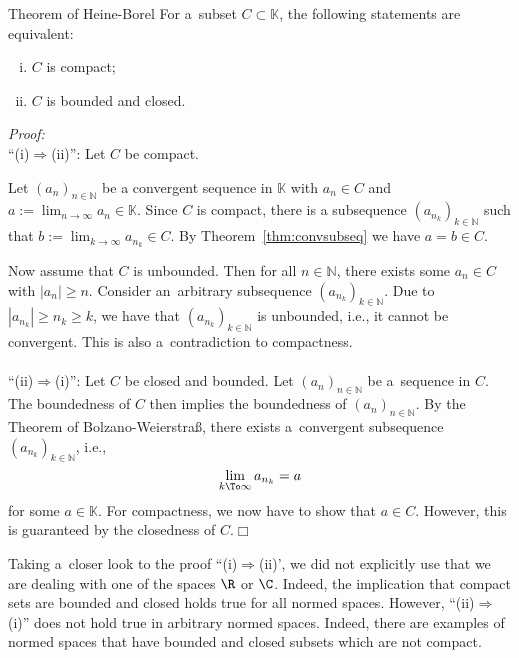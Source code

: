
\begin{Theorem}{Theorem of Heine-Borel}
For a~subset $C\subset\mathbb{K}$, the following statements are equivalent:
\begin{enumerate}[(i)]
 \item $C$ is compact;
 \item $C$ is bounded and closed.
\end{enumerate}
\end{Theorem}
{\em Proof:} \\
``(i)$\Rightarrow$(ii)'': Let $C$ be compact. 

Let $(a_n)_{n\in\mathbb{N}}$ be a convergent sequence in $\mathbb{K}$ with $a_n\in C$ and $a:=\lim_{n\rightarrow\infty} a_n \in\mathbb{K}$. 
Since $C$ is compact, there is a subsequence $(a_{n_k})_{k\in\mathbb{N}}$ such that $b:=\lim_{k\rightarrow\infty} a_{n_k}\in C$.
By Theorem~\ref{thm:convsubseq} we have $a=b\in C$.

Now assume that $C$ is unbounded. Then for all $n\in\mathbb{N}$, there exists some $a_n\in C$ with $|a_n|\geq n$. Consider an~arbitrary subsequence $(a_{n_k})_{k\in\mathbb{N}}$. Due to $|a_{n_k}|\geq n_k\geq k$, we have that $(a_{n_k})_{k\in\mathbb{N}}$ is unbounded, i.e., it cannot be convergent. This is also a~contradiction to compactness.\\
~\\
``(ii)$\Rightarrow$(i)'':
Let $C$ be closed and bounded. Let  $(a_n)_{n\in\mathbb{N}}$ be a~sequence in $C$. The boundedness of $C$ then implies the boundedness of $(a_n)_{n\in\mathbb{N}}$. By the Theorem of Bolzano-Weierstra\ss, there exists a~convergent subsequence  $(a_{n_k})_{k\in\mathbb{N}}$, i.e.,
\[\lim_{k\To\infty}a_{n_k}=a\]
for some $a\in\mathbb{K}$. For compactness, we now have to show that $a\in C$. However, this is guaranteed by the closedness of $C$.\hfill$\Box$
\begin{Remark}{}
Taking a~closer look to the proof ``(i)$\Rightarrow$(ii)', we did not explicitly use that we are dealing with one of the spaces $\R$ or $\C$. Indeed, the implication that compact sets are bounded and closed holds true for all normed spaces. However, ``(ii)$\Rightarrow$(i)'' does not hold true in arbitrary normed spaces. Indeed, there are examples of normed spaces that have bounded and closed subsets which are not compact.
\end{Remark}
